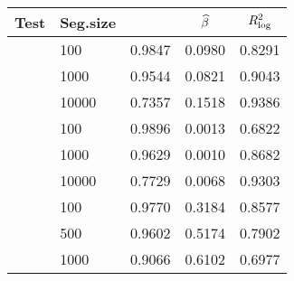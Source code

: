 	\begin{tabular}{ll>{\hspace{1em}}cc>{\hspace{1em}}c}
	\toprule
	\textbf{Test} & \textbf{Seg.size} & %
	\textbf{\Rlin} & %
		\textbf{$\widehat{\mathcal{\beta}}$}& 
		$R^2_\textrm{log}$\\
		\midrule
		 &
		100&0.9847& 0.0980&0.8291\\
		& 1000&0.9544&0.0821&0.9043\\
		& 10000&0.7357&0.1518&0.9386\\
		\midrule
		 &
		100&0.9896&0.0013&0.6822\\
		& 1000&0.9629&0.0010&0.8682\\
		& 10000&0.7729&0.0068&0.9303\\
		\midrule
		 &
		100 &0.9770&0.3184&0.8577\\
		& 500 &0.9602&0.5174&0.7902\\
		& 1000 &0.9066&0.6102&0.6977\\
		\bottomrule
	\end{tabular}
